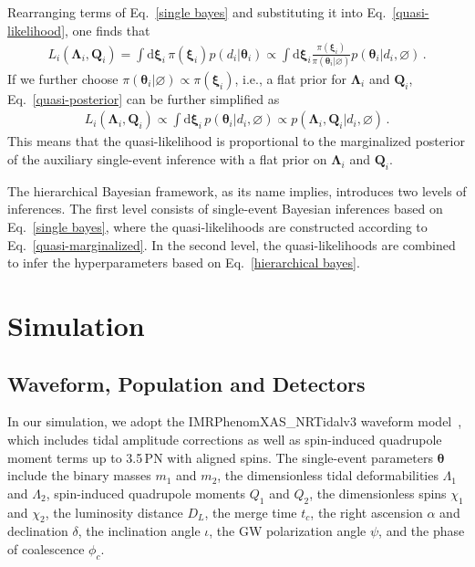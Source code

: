 \documentclass[a4paper,11pt]{article}
\begin{document}
Rearranging terms of Eq.~\eqref{single bayes} and substituting it into
Eq.~\eqref{quasi-likelihood}, one finds that
\begin{equation}
\label{quasi-posterior}
\begin{aligned}
    L_i(\bm{\Lambda}_i,\bm{Q}_i) = \int \text{d}\bm{\xi}_i \,
    \pi(\bm{\xi}_i)p(d_i|\bm{\theta}_i) \propto \int \text{d}\bm{\xi}_i
    \frac{\pi(\bm{\xi}_i)}{\pi(\bm{\theta}_i
    |\varnothing)}p(\bm{\theta}_i|d_i,\varnothing)\,.
\end{aligned}  
\end{equation}
If we further choose $\pi(\bm{\theta}_i|\varnothing) \propto\pi(\bm{\xi}_i)$, 
i.e., a flat prior for $\bm{\Lambda}_i$ and $\bm{Q}_i$,
Eq.~\eqref{quasi-posterior} can be further simplified as 
\begin{equation}
\label{quasi-marginalized}
\begin{aligned}
    L_i(\bm{\Lambda}_i,\bm{Q}_i) \propto \int \text{d} \bm{\xi}_i \,
    p(\bm{\theta}_i|d_i, \varnothing)\propto p(\bm{\Lambda}_i,
    \bm{Q}_i|d_i,\varnothing)\,.
\end{aligned}  
\end{equation}
This means that the quasi-likelihood is proportional to the marginalized
posterior of the auxiliary single-event inference with a flat prior on
$\bm{\Lambda}_i$ and $\bm{Q}_i$. 

The hierarchical Bayesian framework, as its name implies, introduces two levels
of inferences. The first level consists of single-event Bayesian inferences
based on Eq.~\eqref{single bayes}, where the quasi-likelihoods are constructed
according to Eq.~\eqref{quasi-marginalized}. In the second level, the
quasi-likelihoods are combined to infer the hyperparameters based on
Eq.~\eqref{hierarchical bayes}.


\section{Simulation}
\label{sec:simulation}

\subsection{Waveform, Population and Detectors}
\label{subsec:simulation_preliminaries}

In our simulation, we adopt the {\sc IMRPhenomXAS\_NRTidalv3} waveform
model~\cite{Abac:2023ujg}, which includes tidal amplitude corrections as well as
spin-induced quadrupole moment terms up to 3.5\,PN with aligned spins.  The
single-event parameters $\bm{\theta}$ include the binary masses $m_1$ and $m_2$,
the dimensionless tidal deformabilities $\Lambda_1$ and $\Lambda_2$,
spin-induced quadrupole moments $Q_1$ and $Q_2$, the dimensionless spins
$\chi_1$ and $\chi_2$, the luminosity distance $D_L$, the merge time $t_{c}$,
the right ascension $\alpha$ and declination $\delta$, the inclination angle
$\iota$, the GW polarization angle $\psi$, and the phase of coalescence
$\phi_{c}$.
\end{document}
